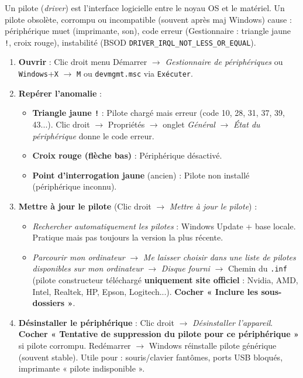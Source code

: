 \documentclass[11pt]{article}
\newcommand{\cle}[1]{{\popxbold\color{popdark}#1}}
\begin{document}
\begin{methode}
Un \cle{pilote} (\emph{driver}) est l'interface logicielle entre le noyau OS et le matériel. Un pilote obsolète, corrompu ou incompatible (souvent après maj Windows) cause : périphérique muet (imprimante, son), code erreur (Gestionnaire : triangle jaune \texttt{!}, croix rouge), instabilité (BSOD \texttt{DRIVER\_IRQL\_NOT\_LESS\_OR\_EQUAL}).
\begin{enumerate}
\item \textbf{Ouvrir} : Clic droit menu Démarrer $\rightarrow$ \emph{Gestionnaire de périphériques} ou \texttt{Windows}+\texttt{X} $\rightarrow$ \texttt{M} ou \texttt{devmgmt.msc} via \texttt{Exécuter}.
\item \textbf{Repérer l'anomalie} :
    \begin{itemize}
    \item \textbf{Triangle jaune \texttt{!}} : Pilote chargé mais erreur (code 10, 28, 31, 37, 39, 43...). Clic droit $\rightarrow$ Propriétés $\rightarrow$ onglet \emph{Général} $\rightarrow$ \emph{État du périphérique} donne le code erreur.
    \item \textbf{Croix rouge (flèche bas)} : Périphérique désactivé.
    \item \textbf{Point d'interrogation jaune} (ancien) : Pilote non installé (périphérique inconnu).
    \end{itemize}
\item \textbf{Mettre à jour le pilote} (Clic droit $\rightarrow$ \emph{Mettre à jour le pilote}) :
    \begin{itemize}
    \item \emph{Rechercher automatiquement les pilotes} : Windows Update + base locale. Pratique mais pas toujours la version la plus récente.
    \item \emph{Parcourir mon ordinateur} $\rightarrow$ \emph{Me laisser choisir dans une liste de pilotes disponibles sur mon ordinateur} $\rightarrow$ \emph{Disque fourni} $\rightarrow$ Chemin du \texttt{.inf} (pilote constructeur téléchargé \textbf{uniquement site officiel} : Nvidia, AMD, Intel, Realtek, HP, Epson, Logitech...). \textbf{Cocher « Inclure les sous-dossiers »}.
    \end{itemize}
\item \textbf{Désinstaller le périphérique} : Clic droit $\rightarrow$ \emph{Désinstaller l'appareil}. \textbf{Cocher « Tentative de suppression du pilote pour ce périphérique »} si pilote corrompu. Redémarrer $\rightarrow$ Windows réinstalle pilote générique (souvent stable). Utile pour : souris/clavier fantômes, ports USB bloqués, imprimante « pilote indisponible ».

\end{enumerate}
\end{methode}
\end{document}
